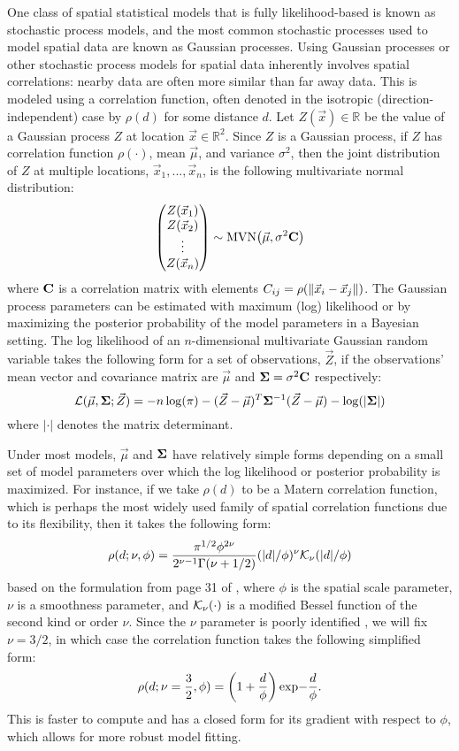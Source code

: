 {One class of spatial statistical models that is fully likelihood-based is known as stochastic process models, and the most common stochastic processes used to model spatial data are known as Gaussian processes.  Using Gaussian processes or other stochastic process models for spatial data inherently involves spatial correlations: nearby data are often more similar than far away data.  This is modeled using a correlation function, often denoted in the isotropic (direction-independent) case by $\rho(d)$ for some distance $d$.  Let $Z(\vec{x}) \in \mathbb{R}$ be the value of a Gaussian process $Z$ at location $\vec{x} \in \mathbb{R}^2$.  Since $Z$ is a Gaussian process, if $Z$ has correlation function $\rho(\cdot)$, mean $\vec{\mu}$, and variance $\sigma^2$, then the joint distribution of $Z$ at multiple locations, $\vec{x}_1, ..., \vec{x}_n$, is the following multivariate normal distribution:
$$ \begin{pmatrix}
Z(\vec{x}_1) \\
Z(\vec{x}_2) \\
\vdots \\
Z(\vec{x}_n) \\
\end{pmatrix} \sim \text{MVN}\! \left( \vec{\mu}, \sigma^2 \mathbf{C} \right) $$
where $\mathbf{C}$ is a correlation matrix with elements $C_{ij} = \rho(\left \lVert \vec{x}_i - \vec{x}_j \right \rVert)$.  The Gaussian process parameters can be estimated with maximum (log) likelihood or by maximizing the posterior probability of the model parameters in a Bayesian setting.  The log likelihood of an $n$-dimensional multivariate Gaussian random variable takes the following form for a set of observations, $\vec{Z}$, if the observations' mean vector and covariance matrix are $\vec{\mu}$ and $\mathbf{\Sigma} = \sigma^2 \mathbf{C}$ respectively:
\begin{equation}
\mathcal{L}(\vec{\mu}, \mathbf{\Sigma} ; \vec{Z}) = -n\log(\pi) - (\vec{Z} - \vec{\mu})^T \mathbf{\Sigma}^{-1} (\vec{Z} - \vec{\mu}) - \log(|\mathbf{\Sigma}|)
\label{normalLik}
\end{equation}
where $|\cdot|$ denotes the matrix determinant.

Under most models, $\vec{\mu}$ and $\mathbf{\Sigma}$ have relatively simple forms depending on a small set of model parameters over which the log likelihood or posterior probability is maximized.  For instance, if we take $\rho(d)$ to be a Matern correlation function, which is perhaps the most widely used family of spatial correlation functions due to its flexibility, then it takes the following form:
$$ \rho(d; \nu, \phi) = \frac{\pi^{1/2} \phi^{2\nu}}{2^{\nu - 1} \Gamma(\nu + 1/2)} (|d|/\phi)^{\nu} \mathcal{K}_\nu(|d|/\phi) $$
based on the formulation from page 31 of \citet{steinBook}, where $\phi$ is the spatial scale parameter, $\nu$ is a smoothness parameter, and $\mathcal{K}_\nu(\cdot)$ is a modified Bessel function of the second kind or order $\nu$.  Since the $\nu$ parameter is poorly identified \citep[Ch. 1.3]{handbook}, we will fix $\nu=3/2$, in which case the correlation function takes the following simplified form:
$$ \rho(d; \nu=\frac{3}{2}, \phi) = \left(1 + \frac{d}{\phi}\right) \text{exp}{-\frac{d}{\phi}}. $$
This is faster to compute and has a closed form for its gradient with respect to $\phi$, which allows for more robust model fitting.

}
